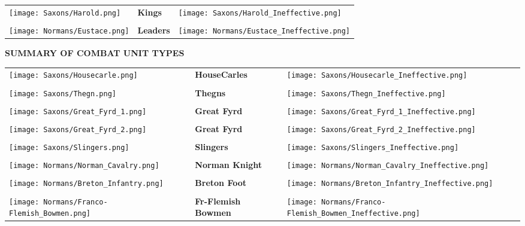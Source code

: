 \begin{tabularx}{0.5\textwidth}{
    >{\raggedright\arraybackslash}X
    >{\centering\arraybackslash}X
    >{\raggedleft\arraybackslash}X}
    \texttt{[image: Saxons/Harold.png]} &
    \textbf{Kings} &
    \texttt{[image: Saxons/Harold\_Ineffective.png]} \\ \\
    \texttt{[image: Normans/Eustace.png]} &
    \textbf{Leaders} &
    \texttt{[image: Normans/Eustace\_Ineffective.png]}
\end{tabularx}

\par
\begin{center}
  \textbf{SUMMARY OF COMBAT UNIT TYPES}
  \break
\end{center}

\begin{tabularx}{0.5\textwidth}{
    >{\raggedright\arraybackslash}X
    >{\centering\arraybackslash}X
    >{\raggedleft\arraybackslash}X}

  \texttt{[image: Saxons/Housecarle.png]} & \textbf{HouseCarles} & \texttt{[image: Saxons/Housecarle\_Ineffective.png]} \\ \\
  \texttt{[image: Saxons/Thegn.png]} & \textbf{Thegns} & \texttt{[image: Saxons/Thegn\_Ineffective.png]} \\ \\
  \texttt{[image: Saxons/Great\_Fyrd\_1.png]} & \textbf{Great Fyrd} & \texttt{[image: Saxons/Great\_Fyrd\_1\_Ineffective.png]} \\ \\
  \texttt{[image: Saxons/Great\_Fyrd\_2.png]} & \textbf{Great Fyrd} & \texttt{[image: Saxons/Great\_Fyrd\_2\_Ineffective.png]} \\ \\
  \texttt{[image: Saxons/Slingers.png]} & \textbf{Slingers} & \texttt{[image: Saxons/Slingers\_Ineffective.png]} \\ \\
  \texttt{[image: Normans/Norman\_Cavalry.png]} & \textbf{Norman Knight} & \texttt{[image: Normans/Norman\_Cavalry\_Ineffective.png]} \\ \\
  \texttt{[image: Normans/Breton\_Infantry.png]} & \textbf{Breton Foot} & \texttt{[image: Normans/Breton\_Infantry\_Ineffective.png]} \\ \\
  \texttt{[image: Normans/Franco-Flemish\_Bowmen.png]} & \textbf{Fr-Flemish Bowmen} & \texttt{[image: Normans/Franco-Flemish\_Bowmen\_Ineffective.png]}
\end{tabularx}

